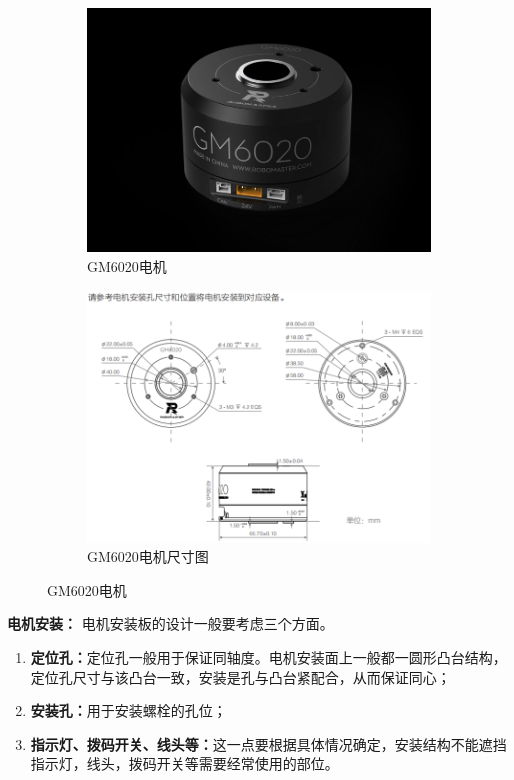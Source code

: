 \documentclass[UTF8]{article} %
\begin{document}
\begin{figure}[H]
  \centering
  \begin{subfigure}[b]{0.4\textwidth}
         \centering
         \includegraphics[width=\textwidth]{dj7.png}
          \caption{GM6020电机}
  \end{subfigure}
  \quad
  \begin{subfigure}[b]{0.39\textwidth}
          \centering
          \includegraphics[width=\textwidth]{dj8.png}
          \caption{GM6020电机尺寸图}
  \end{subfigure}
  \caption{GM6020电机}
\end{figure}

\textbf{电机安装：} 电机安装板的设计一般要考虑三个方面。

\begin{enumerate}
  \item \textbf{定位孔：}定位孔一般用于保证同轴度。电机安装面上一般都一圆形凸台结构，定位孔尺寸与该凸台一致，安装是孔与凸台紧配合，从而保证同心；
  \item \textbf{安装孔：}用于安装螺栓的孔位；
  \item \textbf{指示灯、拨码开关、线头等：}这一点要根据具体情况确定，安装结构不能遮挡指示灯，线头，拨码开关等需要经常使用的部位。
\end{enumerate}
\end{document}
